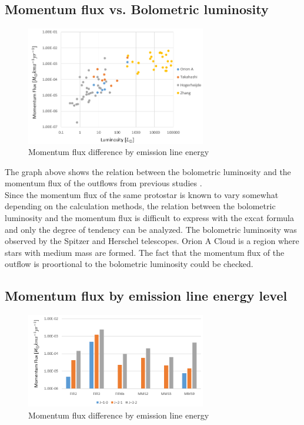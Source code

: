 \documentclass[twoside,11pt]{gshs_thesis}
\begin{document}
\subsection{Momentum flux vs. Bolometric luminosity}


\begin{figure}[h!]
	\centering
	\includegraphics[width=0.7\textwidth]{Luminosity.PNG}
	\caption{Momentum flux difference by emission line energy}
\end{figure}


The graph above shows the relation between the bolometric luminosity and the momentum flux of the outflows from previous studies \cite{Takahashi, Marel, Hogerheijde, Nakamura, Aso, Zhang}. \\ Since the momentum flux of the same protostar is known to vary somewhat depending on the calculation methods\cite{Marel}, the relation between the bolometric luminosity and the momentum flux is difficult to express with the excat formula and only the degree of tendency can be analyzed.
The bolometric luminosity was observed by the Spitzer and Herschel telescopes. Orion A Cloud is a region where stars with medium mass are formed. The fact that the momentum flux of the outflow is proortional to the bolometric luminosity could be checked.

\newpage

\subsection{Momentum flux by emission line energy level}

\begin{figure}[h!]
	\centering
	\includegraphics[width=0.7\textwidth]{J.PNG}
	\caption{Momentum flux difference by emission line energy}
\end{figure}
\end{document}
